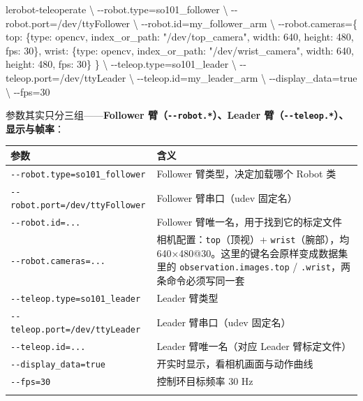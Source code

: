 \documentclass[
  chinese,
]{ctexart}
\newenvironment{Shaded}{\begin{snugshade}}{\end{snugshade}}
\newcommand{\AttributeTok}[1]{\textcolor[rgb]{0.40,0.45,0.13}{#1}}
\newcommand{\DataTypeTok}[1]{\textcolor[rgb]{0.68,0.00,0.00}{#1}}
\newcommand{\ExtensionTok}[1]{\textcolor[rgb]{0.00,0.23,0.31}{#1}}
\newcommand{\NormalTok}[1]{\textcolor[rgb]{0.00,0.23,0.31}{#1}}
\newcommand{\OperatorTok}[1]{\textcolor[rgb]{0.37,0.37,0.37}{#1}}
\newcommand{\StringTok}[1]{\textcolor[rgb]{0.13,0.47,0.30}{#1}}
\begin{document}
\begin{Shaded}
\begin{Highlighting}[]
\ExtensionTok{lerobot{-}teleoperate} \DataTypeTok{\textbackslash{}}
    \AttributeTok{{-}{-}robot.type}\OperatorTok{=}\NormalTok{so101\_follower }\DataTypeTok{\textbackslash{}}
    \AttributeTok{{-}{-}robot.port}\OperatorTok{=}\NormalTok{/dev/ttyFollower }\DataTypeTok{\textbackslash{}}
    \AttributeTok{{-}{-}robot.id}\OperatorTok{=}\NormalTok{my\_follower\_arm }\DataTypeTok{\textbackslash{}}
    \AttributeTok{{-}{-}robot.cameras}\OperatorTok{=}\StringTok{\textquotesingle{}\{}
\StringTok{        top:   \{type: opencv, index\_or\_path: "/dev/top\_camera",   width: 640, height: 480, fps: 30\},}
\StringTok{        wrist: \{type: opencv, index\_or\_path: "/dev/wrist\_camera", width: 640, height: 480, fps: 30\}}
\StringTok{      \}\textquotesingle{}} \DataTypeTok{\textbackslash{}}
    \AttributeTok{{-}{-}teleop.type}\OperatorTok{=}\NormalTok{so101\_leader }\DataTypeTok{\textbackslash{}}
    \AttributeTok{{-}{-}teleop.port}\OperatorTok{=}\NormalTok{/dev/ttyLeader }\DataTypeTok{\textbackslash{}}
    \AttributeTok{{-}{-}teleop.id}\OperatorTok{=}\NormalTok{my\_leader\_arm }\DataTypeTok{\textbackslash{}}
    \AttributeTok{{-}{-}display\_data}\OperatorTok{=}\NormalTok{true }\DataTypeTok{\textbackslash{}}
    \AttributeTok{{-}{-}fps}\OperatorTok{=}\NormalTok{30}
\end{Highlighting}
\end{Shaded}

参数其实只分三组------\textbf{Follower
臂（\texttt{-\/-robot.*}）、Leader
臂（\texttt{-\/-teleop.*}）、显示与帧率}：

\begin{center}
\begin{tabular}{@{}>{\raggedright\arraybackslash}p{} >{\raggedright\arraybackslash}p{}@{}}
\toprule\noalign{}
参数 & 含义 \\
\midrule\noalign{}
\texttt{-\/-robot.type=so101\_\allowbreak follower} & Follower 臂类型，决定加载哪个 Robot 类 \\
\texttt{-\/-robot.port=/dev/ttyFollower} & Follower 臂串口（udev 固定名） \\
\texttt{-\/-robot.id=...} & Follower 臂唯一名，用于找到它的标定文件 \\
\texttt{-\/-robot.cameras=...} & 相机配置：\texttt{top}（顶视）+ \texttt{wrist}（腕部），均 640×480@30。这里的键名会原样变成数据集里的 \texttt{observation.images.top} / \texttt{.wrist}，两条命令必须写同一套 \\
\texttt{-\/-teleop.type=so101\_\allowbreak leader} & Leader 臂类型 \\
\texttt{-\/-teleop.port=/dev/ttyLeader} & Leader 臂串口（udev 固定名） \\
\texttt{-\/-teleop.id=...} & Leader 臂唯一名（对应 Leader 臂标定文件） \\
\texttt{-\/-display\_\allowbreak data=true} & 开实时显示，看相机画面与动作曲线 \\
\texttt{-\/-fps=30} & 控制环目标频率 30 Hz \\
\bottomrule\noalign{}
\end{tabular}
\end{center}
\end{document}
